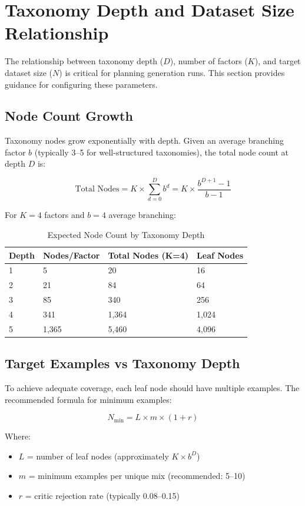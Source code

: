 \documentclass[12pt,a4paper,twoside]{report}
\begin{document}
\section{Taxonomy Depth and Dataset Size Relationship}
\label{sec:depth-size-relationship}

The relationship between taxonomy depth ($D$), number of factors ($K$), and target
dataset size ($N$) is critical for planning generation runs. This section provides
guidance for configuring these parameters.

\subsection{Node Count Growth}

Taxonomy nodes grow exponentially with depth. Given an average branching factor $b$
(typically 3--5 for well-structured taxonomies), the total node count at depth $D$ is:

\[
\text{Total Nodes} = K \times \sum_{d=0}^{D} b^d = K \times \frac{b^{D+1} - 1}{b - 1}
\]

\noindent
For $K=4$ factors and $b=4$ average branching:

\begin{table}[H]
\centering
\caption{Expected Node Count by Taxonomy Depth}
\label{tab:depth-nodes}
\begin{tabular}{llll}
\toprule
\textbf{Depth} & \textbf{Nodes/Factor} & \textbf{Total Nodes (K=4)} & \textbf{Leaf Nodes} \\
\midrule
1 & 5 & 20 & 16 \\
2 & 21 & 84 & 64 \\
3 & 85 & 340 & 256 \\
4 & 341 & 1,364 & 1,024 \\
5 & 1,365 & 5,460 & 4,096 \\
\bottomrule
\end{tabular}
\end{table}

\subsection{Target Examples vs Taxonomy Depth}

To achieve adequate coverage, each leaf node should have multiple examples. The
recommended formula for minimum examples:

\[
N_{\min} = L \times m \times (1 + r)
\]

\noindent
Where:
\begin{itemize}
\item $L$ = number of leaf nodes (approximately $K \times b^D$)
\item $m$ = minimum examples per unique mix (recommended: 5--10)
\item $r$ = critic rejection rate (typically 0.08--0.15)
\end{itemize}
\end{document}
